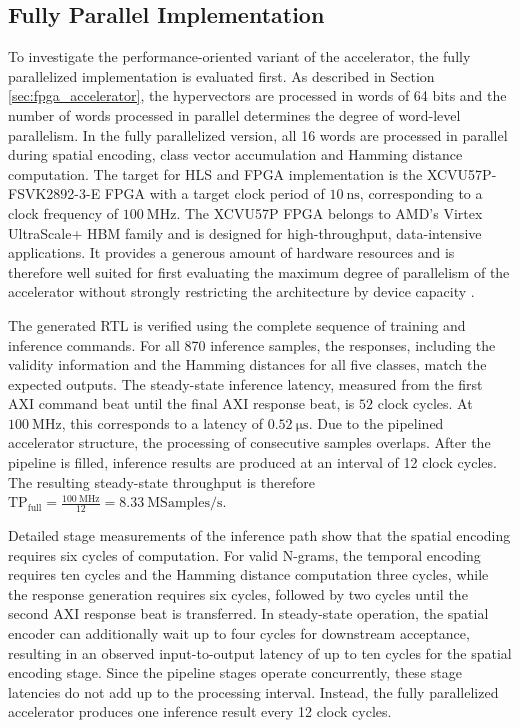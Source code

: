 \subsection{Fully Parallel Implementation}
\label{sec:FullyParallelResults}

To investigate the performance-oriented variant of the accelerator, the fully parallelized implementation is evaluated first.
As described in Section \ref{sec:fpga_accelerator}, the hypervectors are processed in words of 64 bits and the number of words processed in parallel determines the degree of word-level parallelism. In the fully parallelized version, all 16 words are processed in parallel during spatial encoding, class vector accumulation and Hamming distance computation. The target for HLS and FPGA implementation is the XCVU57P-FSVK2892-3-E FPGA with a target clock period of $10~\mathrm{ns}$, corresponding to a clock frequency of $100~\mathrm{MHz}$. The XCVU57P FPGA belongs to AMD's Virtex UltraScale+ HBM family and is designed for high-throughput, data-intensive applications. It provides a generous amount of hardware resources and is therefore well suited for first evaluating the maximum degree of parallelism of the accelerator without strongly restricting the architecture by device capacity \cite{amd_virtex_nodate}.

The generated RTL is verified using the complete sequence of training and inference commands. For all 870 inference samples, the responses, including the validity information and the Hamming distances for all five classes, match the expected outputs. 
The steady-state inference latency, measured from the first AXI command beat until the final AXI response beat, is $52$ clock cycles. At $100~\mathrm{MHz}$, this corresponds to a latency of $0.52~\mathrm{\mu s}$. Due to the pipelined accelerator structure, the processing of consecutive samples overlaps. After the pipeline is filled, inference results are produced at an interval of 12 clock cycles. The resulting steady-state throughput is therefore $\mathrm{TP}_{\mathrm{full}}=\frac{100~\mathrm{MHz}}{12}=8.33~\mathrm{MSamples/s}.$

Detailed stage measurements of the inference path show that the spatial encoding requires six cycles of computation. For valid N-grams, the temporal encoding requires ten cycles and the Hamming distance computation three cycles, while the response generation requires six cycles, followed by two cycles until the second AXI response beat is transferred. In steady-state operation, the spatial encoder can additionally wait up to four cycles for downstream acceptance, resulting in an observed input-to-output latency of up to ten cycles for the spatial encoding stage. Since the pipeline stages operate concurrently, these stage latencies do not add up to the processing interval. Instead, the fully parallelized accelerator produces one inference result every 12 clock cycles.

